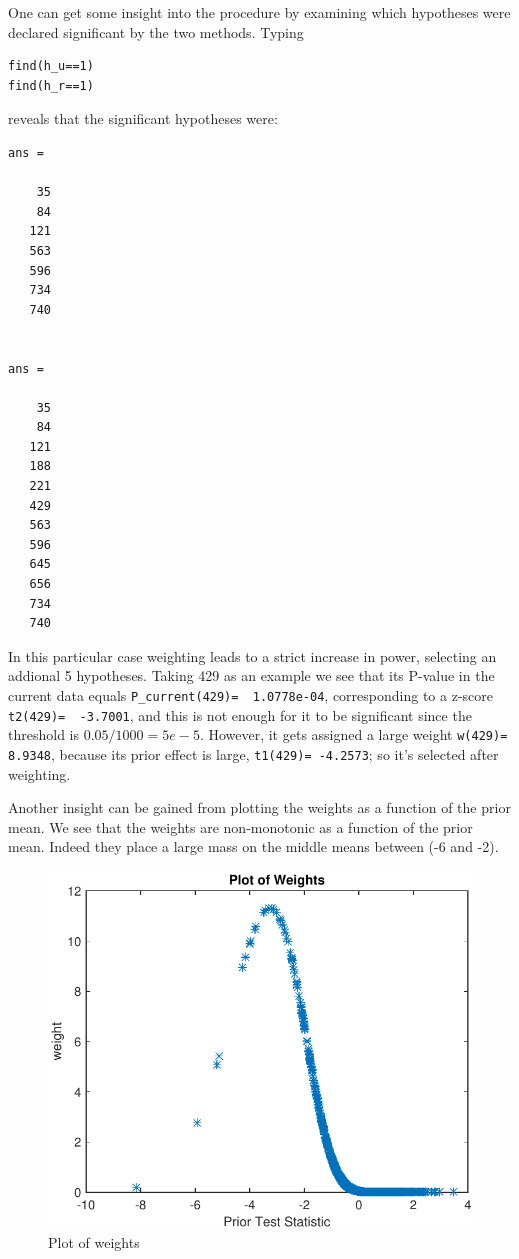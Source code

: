 \documentclass[english,11pt]{article} %
\begin{document}
One can get some insight into the procedure by examining which hypotheses were declared significant by the two methods. Typing

\begin{verbatim}
find(h_u==1)
find(h_r==1)
\end{verbatim}

reveals that the significant hypotheses were:

\begin{verbatim}
ans =

    35
    84
   121
   563
   596
   734
   740


ans =

    35
    84
   121
   188
   221
   429
   563
   596
   645
   656
   734
   740
\end{verbatim}

In this particular case weighting leads to a strict increase in power, selecting an addional 5 hypotheses. Taking 429 as an example we see that its P-value in the current data equals \verb+P_current(429)=  1.0778e-04+, corresponding to a z-score \verb+t2(429)=  -3.7001+, and this is not enough for it to be significant since the threshold is $0.05/1000=5e-5$. However, it gets assigned a large weight  \verb+w(429)=  8.9348+, because its prior  effect is large, \verb+t1(429)= -4.2573+; so it's selected after weighting.

Another insight can be gained from plotting the weights as a function of the prior mean. We see that the weights are non-monotonic as a function of the prior mean. Indeed they place a large mass on the middle means between (-6 and -2).


\begin{figure}[ht!]
\centering
\includegraphics[scale=0.6]{"../Data/weights"}
\caption{Plot of weights}
\label{scatter_prior_current}
\end{figure}





\end{document}
